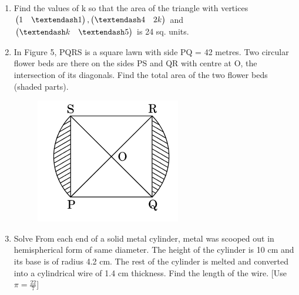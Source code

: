\documentclass[journal,12pt,twocolumn]{IEEEtran}
\renewcommand\thesection{\arabic{section}}
\begin{document}
\begin{enumerate}[label=\thesection.\arabic*.,ref=\thesection.\theenumi]
\begin{itemize}
 \end{itemize}
 \item Find the values of k so that the area of the triangle with vertices $\myvec{1 &– 1}, \myvec{– 4 & 2k} $ and $\myvec{–k & –5}$ is 24 sq. units.
 \item In Figure 5, PQRS is a square lawn with side PQ = 42 metres. Two circular flower beds are there on the sides PS and QR with centre at O, the intersection of its diagonals. Find the total area of the two flower beds (shaded parts).
 \begin{figure}[h!]
	\centering
    \includegraphics[width=0.5\columnwidth,center]{./fig/image5.png}
	\caption{}
	\label{fig5}
\end{figure}
 \item Solve From each end of a solid metal cylinder, metal was scooped out in hemispherical form of same diameter. The height of the cylinder is 10 cm and its base is of radius 4.2 cm. The rest of the cylinder is melted and converted into a cylindrical wire of 1.4 cm thickness. Find the length of the wire. [Use $ \pi=\frac{22}{7} $]
\end{enumerate}
\end{document}
